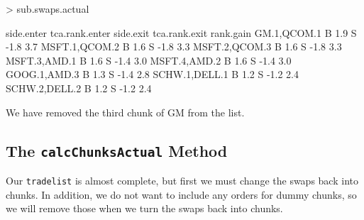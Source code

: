 \documentclass{article}
\begin{document}
\begin{Schunk}
\begin{Sinput}
> sub.swaps.actual
\end{Sinput}
\begin{Soutput}
              side.enter tca.rank.enter side.exit tca.rank.exit rank.gain
GM.1,QCOM.1            B            1.9         S          -1.8       3.7
MSFT.1,QCOM.2          B            1.6         S          -1.8       3.3
MSFT.2,QCOM.3          B            1.6         S          -1.8       3.3
MSFT.3,AMD.1           B            1.6         S          -1.4       3.0
MSFT.4,AMD.2           B            1.6         S          -1.4       3.0
GOOG.1,AMD.3           B            1.3         S          -1.4       2.8
SCHW.1,DELL.1          B            1.2         S          -1.2       2.4
SCHW.2,DELL.2          B            1.2         S          -1.2       2.4
\end{Soutput}
\end{Schunk}


We have removed the third chunk of GM from the list.

\subsection{The \texttt{calcChunksActual} Method}
\label{calcChunksActual}

Our \texttt{tradelist} is almost complete, but first we must change
the swaps back into chunks.  In addition, we do not want to include
any orders for dummy chunks, so we will remove those when we turn the
swaps back into chunks.  
\end{document}
